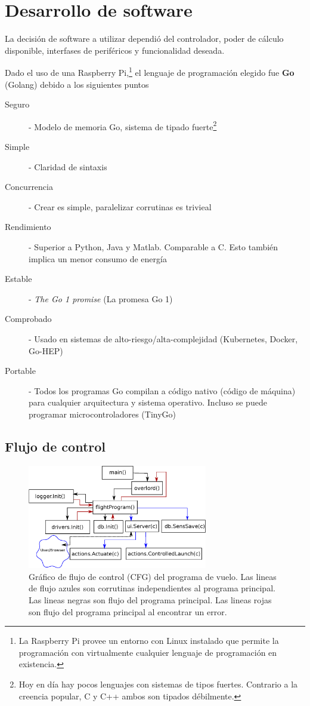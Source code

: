 \section{Desarrollo de software}

La decisión de software a utilizar dependió del controlador, poder de cálculo disponible, interfases de periféricos y funcionalidad deseada.

\medskip

Dado el uso de una Raspberry Pi,\footnote{La Raspberry Pi provee un entorno con Linux instalado que permite la programación con virtualmente cualquier lenguaje de programación en existencia.} el lenguaje de programación elegido fue \textbf{Go} (Golang) debido a los siguientes puntos

\begin{description}
    \item[Seguro] - Modelo de memoria Go, sistema de tipado fuerte\footnote{Hoy en día hay pocos lenguajes con sistemas de tipos fuertes. Contrario a la creencia popular, C y C++ ambos son tipados débilmente.}
    \item[Simple] - Claridad de sintaxis
    \item[Concurrencia] - Crear  es simple, paralelizar corrutinas es trivieal
    \item[Rendimiento] - Superior a Python, Java y Matlab. Comparable a C. Esto también implica un menor consumo de energía
    \item[Estable] - \textit{The Go 1 promise} (La promesa Go 1)
    \item[Comprobado] -  Usado en sistemas de alto-riesgo/alta-complejidad (Kubernetes, Docker, Go-HEP)
    \item[Portable] - Todos los programas Go compilan a código nativo (código de máquina) para cualquier arquitectura y sistema operativo. Incluso se puede programar microcontroladores (TinyGo)
\end{description}

\subsection{Flujo de control}
\begin{figure}[!htb]
    \centering
    \includegraphics[width=0.7\textwidth]{fig/cfg_flightprogram.eps}
    \caption{Gráfico de flujo de control (CFG) del programa de vuelo. Las lineas de flujo azules son corrutinas independientes al programa principal. Las lineas negras son flujo del programa principal. Las lineas rojas son flujo del programa principal al encontrar un error.}
    \label{fig:flightProgram}
\end{figure}

